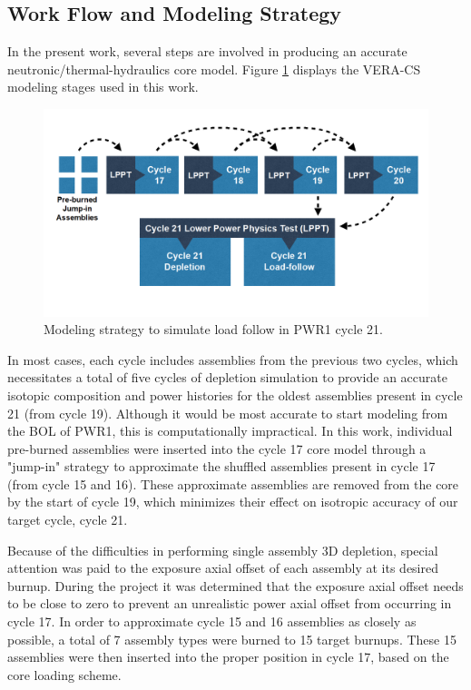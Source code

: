 \documentclass[edeposit,fullpage,12pt]{uiucthesis2009}
\begin{document}
\subsection{Work Flow and Modeling Strategy}

In the present work, several steps are involved in producing an accurate neutronic/thermal-hydraulics core model. 
Figure \ref{fig:method} displays the VERA-CS modeling stages used in this work.


\begin{figure}
\begin{center}
\includegraphics[width=0.5\linewidth]{./Figures/method.png}
\end{center}
\caption{Modeling strategy to simulate load follow in PWR1 cycle 21.}
\label{fig:method}
\end{figure} 

In most cases, each cycle includes assemblies from the previous two cycles, which necessitates a total of five cycles of depletion simulation to provide an accurate isotopic composition and power histories for the oldest assemblies present in cycle 21 (from cycle 19). 
Although it would be most accurate to start modeling from the \gls{BOL} of PWR1, this is computationally impractical. 
In this work, individual pre-burned assemblies were inserted into the cycle 17 core model through a "jump-in" strategy to approximate the shuffled assemblies present in cycle 17 (from cycle 15 and 16). 
These approximate assemblies are removed from the core by the start of cycle 19, which minimizes their effect on isotropic accuracy of our target cycle, cycle 21. 

Because of the difficulties in performing single assembly 3D depletion, special attention was paid to the exposure axial offset of each assembly at its desired burnup. 
During the project it was determined that the exposure axial offset needs to be close to zero to prevent an unrealistic power axial offset from occurring in cycle 17. 
In order to approximate cycle 15 and 16 assemblies as closely as possible, a total of 7 assembly types were burned to 15 target burnups. 
These 15 assemblies were then inserted into the proper position in cycle 17, based on the core loading scheme.
\end{document}
